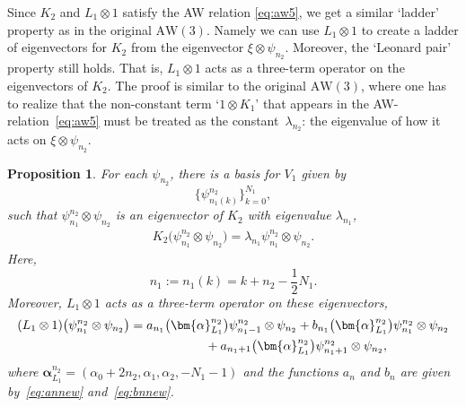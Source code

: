 \documentclass[10pt,a4paper]{amsart}
\numberwithin{equation}{section}
\newtheorem{Proposition}[Theorem]{Proposition}
 { \theoremstyle{definition}
\newtheorem{Definition}[Theorem]{Definition}
\newtheorem{Note}[Theorem]{Note}
\newtheorem{Example}[Theorem]{Example}
\newtheorem{Remark}[Theorem]{Remark} }
\newcommand{\aw}{\mathrm{AW}\!\left(3\right)}
\newcommand{\half}{\frac{1}{2}}
\begin{document}
Since $K_2$ and $L_1\otimes 1$ satisfy the AW relation \eqref{eq:aw5}, we get a similar `ladder' property as in the original $\aw$. Namely we can use $L_1\otimes 1$ to create a ladder of eigenvectors for $K_2$ from the eigenvector $\xi\otimes\psi_{n_2}$. Moreover, the `Leonard pair' property still holds. That is, $L_1\otimes 1$ acts as a three-term operator on the eigenvectors of $K_2$. The proof is similar to the original $\aw$, where one has to realize that the non-constant term `$1\otimes K_1$' that appears in the AW-relation~\eqref{eq:aw5} must be treated as the constant~$\lambda_{n_2}$: the eigenvalue of how it acts on $\xi\otimes \psi_{n_2}$.
\begin{Proposition}\label{prop:opnieuw3term}
	For each $\psi_{n_2}$, there is a basis for $V_1$ given by
	\[
	\big\{\psi_{n_1(k)}^{n_2}\big\}_{k=0}^{N_1},
	\]
	such that $\psi_{n_1}^{n_2}\otimes\psi_{n_2}$ is an eigenvector of $K_2$ with eigenvalue $\lambda_{n_1}$,
	\begin{gather*}
		K_2\big(\psi_{n_1}^{n_2}\otimes\psi_{n_2}\big) = \lambda_{n_1}\psi_{n_1}^{n_2}\otimes\psi_{n_2}.
	\end{gather*}
	Here,
	\[
	n_1:=n_1(k)=k+n_2-\half N_1.
	\]
	Moreover, $L_1\otimes 1$ acts as a three-term operator on these eigenvectors,
	\begin{gather*}
(L_1\otimes 1)\big(\psi_{n_1}^{n_2}\otimes\psi_{n_2}\big)= a_{n_1}\big(\bm{\alpha}_{L_1}^{n_2}\big) \psi_{n_1-1}^{n_2}\otimes\psi_{n_2} + b_{n_1}\big(\bm{\alpha}_{L_1}^{n_2}\big) \psi_{n_1}^{n_2}\otimes\psi_{n_2} \\
\hphantom{(L_1\otimes 1)\big(\psi_{n_1}^{n_2}\otimes\psi_{n_2}\big)=}{}
			 + a_{n_1+1}\big(\bm{\alpha}_{L_1}^{n_2}\big)\psi_{n_1+1}^{n_2}\otimes\psi_{n_2}, %
	\end{gather*}
	where $\bm{\alpha}_{L_1}^{n_2}=(\alpha_0+2n_2,\alpha_1,\alpha_2,-N_1-1)$ and the functions $a_{n}$ and $b_{n}$ are given by~\eqref{eq:annew} and~\eqref{eq:bnnew}.
\end{Proposition}
\end{document}
